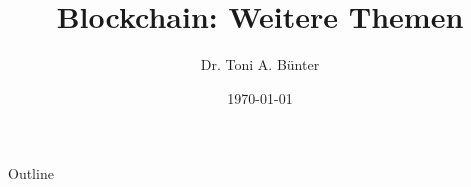 \documentclass{beamer}
\title{Blockchain: Weitere Themen}
\author{Dr. Toni A. Bünter}
\date{\today}
\begin{document}
\begin{frame}
    \titlepage
\end{frame}

\logo{}


\begin{frame}{Outline}
    \tableofcontents
\end{frame}






\end{document}
